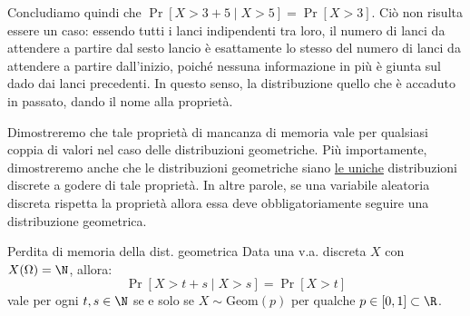 \documentclass[a4paper, 12pt]{report}
\begin{document}
    Concludiamo quindi che $ \Pr[X > 3+5 \mid X > 5] = \Pr[X > 3]$. Ciò non risulta essere un caso: essendo tutti i lanci indipendenti tra loro, il numero di lanci da attendere a partire dal sesto lancio è esattamente lo stesso del numero di lanci da attendere a partire dall'inizio, poiché nessuna informazione in più è giunta sul dado dai lanci precedenti. In questo senso, la distribuzione  quello che è accaduto in passato, dando il nome alla proprietà.
    
    Dimostreremo che tale proprietà di mancanza di memoria vale per qualsiasi coppia di valori nel caso delle distribuzioni geometriche. Più importamente, dimostreremo anche che le distribuzioni geometriche siano \underline{le uniche} distribuzioni discrete a godere di tale proprietà. In altre parole, se una variabile aleatoria discreta rispetta la proprietà allora essa deve obbligatoriamente seguire una distribuzione geometrica.

    \begin{framedthm}{Perdita di memoria della dist. geometrica}
        Data una v.a. discreta $X$ con $X(\Omega) = \N$, allora:
        \[\Pr[X > t + s \mid X > s ] = \Pr[X > t] \]
        vale per ogni $t,s \in \N$ se e solo se $X \sim \mathrm{Geom}(p)$ per qualche $p \in [0,1] \subset \R$.
    \end{framedthm}
\end{document}
